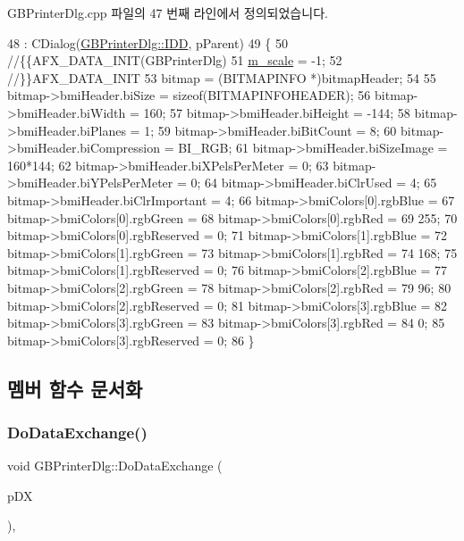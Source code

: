 G\+B\+Printer\+Dlg.\+cpp 파일의 47 번째 라인에서 정의되었습니다.


\begin{DoxyCode}
48   : CDialog(\mbox{\hyperlink{class_g_b_printer_dlg_a1651cac3900d0c9e28bfdb591965155ba37cb81fc068496229b79d232b4279f6b}{GBPrinterDlg::IDD}}, pParent)
49 \{
50   \textcolor{comment}{//\{\{AFX\_DATA\_INIT(GBPrinterDlg)}
51   \mbox{\hyperlink{class_g_b_printer_dlg_a0d0e4757bd074a2ab18268b938f76f85}{m\_scale}} = -1;
52   \textcolor{comment}{//\}\}AFX\_DATA\_INIT}
53   bitmap = (BITMAPINFO *)bitmapHeader;
54   
55   bitmap->bmiHeader.biSize = \textcolor{keyword}{sizeof}(BITMAPINFOHEADER);
56   bitmap->bmiHeader.biWidth = 160;
57   bitmap->bmiHeader.biHeight = -144;
58   bitmap->bmiHeader.biPlanes = 1;
59   bitmap->bmiHeader.biBitCount = 8;
60   bitmap->bmiHeader.biCompression = BI\_RGB;
61   bitmap->bmiHeader.biSizeImage = 160*144;
62   bitmap->bmiHeader.biXPelsPerMeter = 0;
63   bitmap->bmiHeader.biYPelsPerMeter = 0;
64   bitmap->bmiHeader.biClrUsed = 4;
65   bitmap->bmiHeader.biClrImportant = 4;
66   bitmap->bmiColors[0].rgbBlue =
67     bitmap->bmiColors[0].rgbGreen =
68     bitmap->bmiColors[0].rgbRed =
69     255;
70   bitmap->bmiColors[0].rgbReserved = 0;
71   bitmap->bmiColors[1].rgbBlue =
72     bitmap->bmiColors[1].rgbGreen =
73     bitmap->bmiColors[1].rgbRed =
74     168;
75   bitmap->bmiColors[1].rgbReserved = 0;
76   bitmap->bmiColors[2].rgbBlue =
77     bitmap->bmiColors[2].rgbGreen =
78     bitmap->bmiColors[2].rgbRed =
79     96;
80   bitmap->bmiColors[2].rgbReserved = 0;
81   bitmap->bmiColors[3].rgbBlue =
82     bitmap->bmiColors[3].rgbGreen =
83     bitmap->bmiColors[3].rgbRed =
84     0;
85   bitmap->bmiColors[3].rgbReserved = 0;  
86 \}
\end{DoxyCode}


\subsection{멤버 함수 문서화}
\mbox{\label{class_g_b_printer_dlg_a686ce094a0100066f2a6446c908af150}} 
\subsubsection{\texorpdfstring{Do\+Data\+Exchange()}{DoDataExchange()}}
{\footnotesize\ttfamily void G\+B\+Printer\+Dlg\+::\+Do\+Data\+Exchange (\begin{DoxyParamCaption}\item[{C\+Data\+Exchange $\ast$}]{p\+DX }\end{DoxyParamCaption})\hspace{0.3cm}{\ttfamily [protected]}, {\ttfamily [virtual]}}



